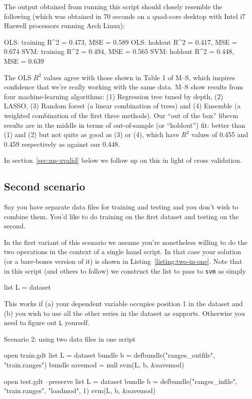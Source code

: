 \documentclass{article}
\begin{document}
The output obtained from running this script should closely resemble
the following (which was obtained in 70 seconds on a quad-core desktop
with Intel i7 Haswell processors running Arch Linux):
\begin{code}
OLS: training R^2 = 0.473, MSE = 0.589
OLS: holdout  R^2 = 0.417, MSE = 0.674
SVM: training R^2 = 0.494, MSE = 0.565
SVM: holdout  R^2 = 0.448, MSE = 0.639
\end{code}
The OLS $R^2$ values agree with those shown in Table 1 of M--S, which
inspires confidence that we're really working with the same data. M--S
show results from four machine-learning algorithms: (1) Regression
tree tuned by depth, (2) LASSO, (3) Random forest (a linear
combination of trees) and (4) Ensemble (a weighted combination of the
first three methods). Our ``out of the box'' \textsf{libsvm} results
are in the middle in terms of out-of-sample (or ``holdout'') fit:
better than (1) and (2) but not quite as good as (3) or (4), which
have $R^2$ values of 0.455 and 0.459 respectively as against our
0.448.

In section~\ref{sec:ms-xvalid} below we follow up on this in light of
cross validation.

\subsection{Second scenario}
\label{sec:s2}

Say you have separate data files for training and testing and you
don't wish to combine them. You'd like to do training on the first
dataset and testing on the second.

In the first variant of this scenario we assume you're nonetheless
willing to do the two operations in the context of a single hansl
script. In that case your solution (or a bare-bones version of it) is
shown in Listing~\ref{listing:two-in-one}. Note that in this script
(and others to follow) we construct the list to pass to \texttt{svm}
as simply
\begin{code}
list L = dataset
\end{code}
This works if (a) your dependent variable occupies position 1 in the
dataset and (b) you wish to use all the other series in the dataset as
supports. Otherwise you need to figure out \texttt{L} yourself.

\begin{script}[htbp]
  \caption{Scenario 2: using two data files in one script}
  \label{listing:two-in-one}
\begin{scode}
open train.gdt
list L = dataset
bundle b = defbundle("ranges_outfile", "train.ranges")
bundle savemod = null
svm(L, b, &savemod)

open test.gdt --preserve
list L = dataset
bundle b = defbundle("ranges_infile", "train.ranges", "loadmod", 1)
svm(L, b, &savemod)
\end{scode}
\end{script}
\end{document}
